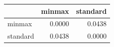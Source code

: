 \begin{tabular}{lrr}
\toprule
 & minmax & standard \\
\midrule
minmax & 0.0000 & 0.0438 \\
standard & 0.0438 & 0.0000 \\
\bottomrule
\end{tabular}
